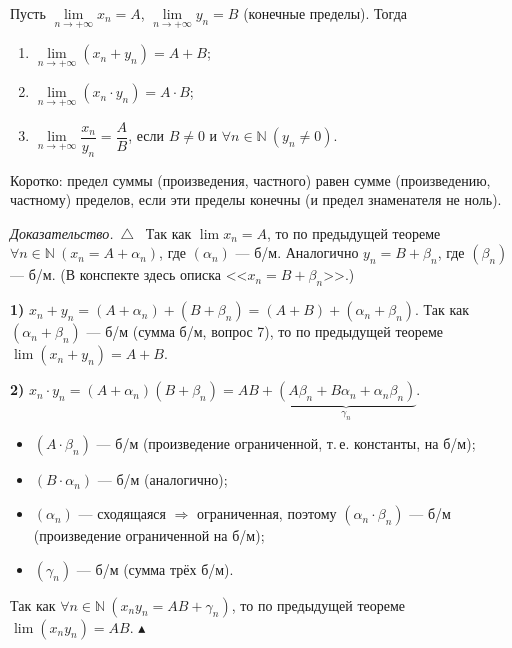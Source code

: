 \documentclass[a4paper,11pt]{article}
\newcommand{\N}{\mathbb{N}}
\newenvironment{dok}
  {\par\smallskip\noindent\textit{Доказательство.}\ $\triangle$\ \ignorespaces}
  {\unskip\nobreak\hfill$\blacktriangle$\par\smallskip}
\begin{document}
\begin{teo}
Пусть $\lim\limits_{n \to +\infty} x_n = A$, $\lim\limits_{n \to +\infty} y_n = B$ (конечные пределы). Тогда
\begin{enumerate}
  \item $\lim\limits_{n \to +\infty} (x_n + y_n) = A + B$;
  \item $\lim\limits_{n \to +\infty} (x_n \cdot y_n) = A \cdot B$;
  \item $\lim\limits_{n \to +\infty} \dfrac{x_n}{y_n} = \dfrac{A}{B}$, если $B \ne 0$ и $\forall n \in \N\ (y_n \ne 0)$.
\end{enumerate}
Коротко: предел суммы (произведения, частного) равен сумме (произведению, частному) пределов, если эти пределы конечны
(и предел знаменателя не ноль).
\end{teo}

\begin{dok}
Так как $\lim x_n = A$, то по предыдущей теореме $\forall n \in \N\ (x_n = A + \alpha_n)$, где $(\alpha_n)$ --- б/м.
Аналогично $y_n = B + \beta_n$, где $(\beta_n)$ --- б/м.
{\small\textcolor{zamc}{(В конспекте здесь описка <<$x_n = B + \beta_n$>>.)}}

\textbf{1)} $x_n + y_n = (A + \alpha_n) + (B + \beta_n) = (A + B) + (\alpha_n + \beta_n)$.
Так как $(\alpha_n + \beta_n)$ --- б/м (сумма б/м, вопрос 7), то по предыдущей теореме $\lim (x_n + y_n) = A + B$.

\textbf{2)} $x_n \cdot y_n = (A + \alpha_n)(B + \beta_n) = AB + \underbrace{(A\beta_n + B\alpha_n + \alpha_n \beta_n)}_{\gamma_n}$.
\begin{itemize}
  \item $(A \cdot \beta_n)$ --- б/м (произведение ограниченной, т.\,е. константы, на б/м);
  \item $(B \cdot \alpha_n)$ --- б/м (аналогично);
  \item $(\alpha_n)$ --- сходящаяся $\Rightarrow$ ограниченная, поэтому $(\alpha_n \cdot \beta_n)$ --- б/м (произведение ограниченной на б/м);
  \item $(\gamma_n)$ --- б/м (сумма трёх б/м).
\end{itemize}
Так как $\forall n \in \N\ (x_n y_n = AB + \gamma_n)$, то по предыдущей теореме $\lim (x_n y_n) = AB$.
\end{dok}
\end{document}
